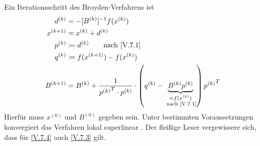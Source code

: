 \documentclass[ngerman,fontsize=11pt, paper=a4, parskip=half, titlepage=true, toc=bib]{scrbook}
\theoremstyle{definition}
\theoremstyle{plain}
\begin{document}
  Ein Iterationsschritt des Broyden-Verfahrens ist 
  \begin{align}\nonumber
    d^{(k)} &= -[B^{(k)}]^{-1} f(x^{(k)}) \\\nonumber
    x^{(k+1)} &= x^{(k)} + d^{(k)} \\\nonumber
    p^{(k)} & \coloneqq d^{(k)} \qquad \text{nach
                                  \eqref{V.7.1}}\\\nonumber
    q^{(k)} & \coloneqq f(x^{(k+1)})-f(x^{(k)}) \\
    B^{(k+1)} & = B^{(k)} + \frac{1}{{p^{(k)}}^T\cdot p^{(k)}}
                \cdot \left(q^{(k)}-
                \underbrace{B^{(k)}p^{(k)}}_{\substack{=f(x^{(k)})\\
                \text{ nach \eqref{V.7.1}}}}
                \right){p^{(k)}}^T
                \label{V.7.4}
  \end{align}
  Hierfür muss $x^{(0)} $ und $B^{(0)}$ gegeben sein.
  Unter bestimmten Voraussetzungen konvergiert das Verfahren lokal
  superlinear \cite[siehe][dortige Referenzen]{stoerbulirsch}.
  Der fleißige Leser vergewissere sich, dass für
  \eqref{V.7.4} auch \eqref{V.7.3} gilt.
\end{document}
